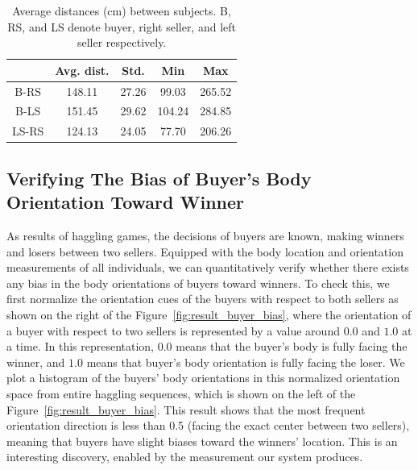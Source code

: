 \begin{table}[t]
	\centering
	\begin{tabular}{c| c| c| c| c}
		\hline
		& Avg. dist. & Std. & Min & Max \\
		\hline
		B-RS & 148.11 & 27.26 & 99.03 & 265.52 \\
		\hline
		B-LS & 151.45 & 29.62 & 104.24  & 284.85 \\
		\hline
		LS-RS & 124.13 & 24.05  & 77.70  & 206.26 \\
		\hline
	\end{tabular}
	\caption{Average distances (cm) between subjects. B, RS, and LS denote buyer, right seller, and left seller respectively.}
	\label{table:proxemics_comp}
\end{table}

\subsection{Verifying The Bias of Buyer's Body Orientation Toward Winner}
As results of haggling games, the decisions of buyers are known, making winners and losers between two sellers. Equipped with the body location and orientation measurements of all individuals, we can quantitatively verify whether there exists any bias in the body orientations of buyers toward winners. To check this, we first normalize the orientation cues of the buyers with respect to both sellers as shown on the right of the Figure~\ref{fig:result_buyer_bias}, where the orientation of a buyer with respect to two sellers is represented by a value around $0.0$ and $1.0$ at a time. In this representation, $0.0$ means that the buyer's body is fully facing the winner, and $1.0$ means that buyer's body orientation is fully facing the loser. We plot a histogram of the buyers' body orientations in this normalized orientation space from entire haggling sequences, which is shown on the left of the Figure~\ref{fig:result_buyer_bias}. This result shows that the most frequent orientation direction is less than 0.5 (facing the exact center between two sellers), meaning that buyers have slight biases toward the winners' location. This is an interesting discovery, enabled by the measurement our system produces. 

